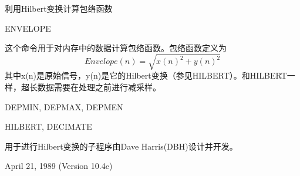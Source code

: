 \label{cmd:envelope}

利用Hilbert变换计算包络函数

ENVELOPE

这个命令用于对内存中的数据计算包络函数。包络函数定义为
	\[ Envelope(n)= \sqrt{x(n)^2+y(n)^2} \]
其中x(n)是原始信号，y(n)是它的Hilbert变换（参见HILBERT）。和HILBERT一样，超长数据需要在处理之前进行减采样。

DEPMIN, DEPMAX, DEPMEN

HILBERT, DECIMATE

用于进行Hilbert变换的子程序由Dave Harris(DBH)设计并开发。

April 21, 1989 (Version 10.4c)
